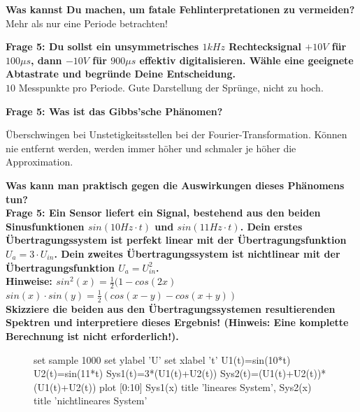 \documentclass[11pt,a4paper]{scrartcl}
\begin{document}
\textbf{Was kannst Du machen, um fatale Fehlinterpretationen zu vermeiden?}\\
Mehr als nur eine Periode betrachten!

\textbf{Frage 5: Du sollst ein unsymmetrisches $1kHz$ Rechtecksignal $+10V$ für $100\mu s$, dann $-10V$ für $900\mu s$ effektiv digitalisieren. Wähle eine geeignete Abtastrate und begründe Deine Entscheidung.}\\
$10$ Messpunkte pro Periode. Gute Darstellung der Sprünge, nicht zu hoch.

\textbf{Frage 5: Was ist das Gibbs'sche Phänomen?}
\begin{center}
\end{center}
Überschwingen bei Unstetigkeitsstellen bei der Fourier-Transformation. Können nie entfernt werden, werden immer höher und schmaler je höher die Approximation.

\textbf{Was kann man praktisch gegen die Auswirkungen dieses Phänomens tun?}\\
\newpage
\textbf{Frage 5: Ein Sensor liefert ein Signal, bestehend aus den beiden Sinusfunktionen $sin(10Hz \cdot t)$ und $sin(11Hz \cdot t)$. Dein erstes Übertragungssystem ist perfekt linear mit der Übertragungsfunktion
$U_{a} = 3 \cdot U_{in}$. Dein zweites Übertragungssystem ist nichtlinear mit der Übertragungsfunktion $U_a =  U_{in}^2$. \\Hinweise: $sin^2(x)=\frac{1}{2}(1-cos(2x)$\\$sin(x)\cdot sin(y) = \frac{1}{2}(cos(x-y)-cos(x+y))$\\ 
Skizziere die beiden aus den Übertragungssystemen resultierenden Spektren und interpretiere dieses Ergebnis! (Hinweis: Eine komplette Berechnung ist nicht erforderlich!).}\\
\begin{figure}[H]
	\centering
	\begin{gnuplot}[terminal=pdf]
			set sample 1000
			set ylabel 'U'
			set xlabel 't'
			U1(t)=sin(10*t)
			U2(t)=sin(11*t)
			Sys1(t)=3*(U1(t)+U2(t))
			Sys2(t)=(U1(t)+U2(t))*(U1(t)+U2(t))
			plot [0:10] Sys1(x) title 'lineares System', Sys2(x) title 'nichtlineares System'
	\end{gnuplot}
\end{figure}
\end{document}
